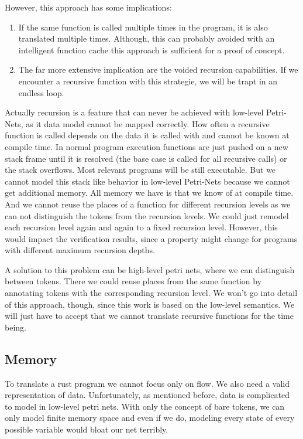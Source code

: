 However, this approach has some implications:
\begin{enumerate}
    \item If the same function is called multiple times in the program, it is also translated multiple times.
    Although, this can probably avoided with an intelligent function cache this approach is sufficient for a proof of concept.
    \item The far more extensive implication are the voided recursion capabilities.
    If we encounter a recursive function with this strategie, we will be trapt in an endless loop.
\end{enumerate}
Actually recursion is a feature that can never be achieved with low-level Petri-Nets, as it data model cannot be mapped correctly.
How often a recursive function is called depends on the data it is called with and cannot be known at compile time.
In normal program execution functions are just pushed on a new stack frame until it is resolved (the base case is called for all recursive calls) or the stack overflows.
Most relevant programs will be still executable.
But we cannot model this stack like behavior in low-level Petri-Nets because we cannot get additional memory.
All memory we have is that we know of at compile time.
And we cannot reuse the places of a function for different recursion levels as we can not distinguish the tokens from the recursion levels.
We could just remodel each recursion level again and again to a fixed recursion level.
However, this would impact the verification results, since a property might change for programs with different maximum recursion depths.

A solution to this problem can be high-level petri nets, where we can distinguish between tokens.
There we could reuse places from the same function by annotating tokens with the corresponding recursion level.
We won't go into detail of this approach, though, since this work is based on the low-level semantics.
We will just have to accept that we cannot translate recursive functions for the time being.

\subsection{Memory}
To translate a rust program we cannot focus only on flow.
We also need a valid representation of data.
Unfortunately, as mentioned before, data is complicated to model in low-level petri nets.
With only the concept of bare tokens, we can only model finite memory space and even if we do, modeling every state of every possible variable would bloat our net terribly.

